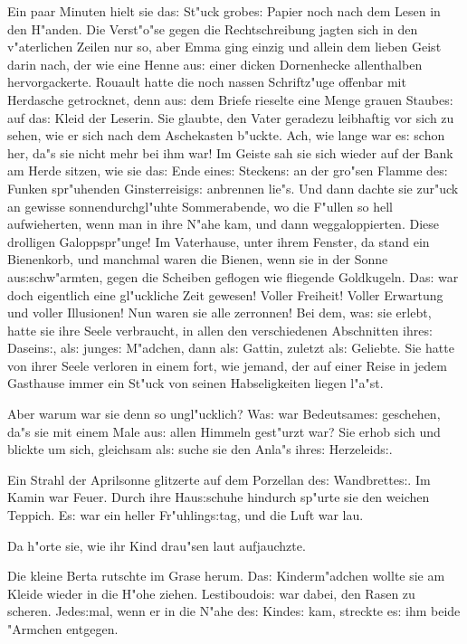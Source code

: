 \documentclass[oneside,12pt]{book}
\newcommand{\s}{s:}%
\begin{document}
Ein paar Minuten hielt sie da{\s} St"uck grobe{\s} Papier noch
nach dem Lesen in den H"anden. Die Verst"o"se gegen die
Rechtschreibung jagten sich in den v"aterlichen Zeilen nur so,
aber Emma ging einzig und allein dem lieben Geist darin nach, der
wie eine Henne au{\s} einer dicken Dornenhecke allenthalben
hervorgackerte. Rouault hatte die noch nassen Schrift\/z"uge
offenbar mit Herdasche getrocknet, denn au{\s} dem Briefe rieselte
eine Menge grauen Staube{\s} auf da{\s} Kleid der Leserin. Sie
glaubte, den Vater geradezu leibhaftig vor sich zu sehen, wie er
sich nach dem Aschekasten b"uckte. Ach, wie lange war e{\s} schon
her, da"s sie nicht mehr bei ihm war! Im Geiste sah sie sich
wieder auf der Bank am Herde sitzen, wie sie da{\s} Ende eine{\s}
Stecken{\s} an der gro"sen Flamme de{\s} Funken spr"uhenden
Ginsterreisig{\s} anbrennen lie"s. Und dann dachte sie zur"uck an
gewisse sonnendurchgl"uhte Sommerabende, wo die F"ullen so hell
aufwieherten, wenn man in ihre N"ahe kam, und dann
weggaloppierten. Diese drolligen Galoppspr"unge! Im Vaterhause,
unter ihrem Fenster, da stand ein Bienenkorb, und manchmal waren
die Bienen, wenn sie in der Sonne au{\s}schw"armten, gegen die
Scheiben geflogen wie fliegende Goldkugeln. Da{\s} war doch
eigentlich eine gl"uckliche Zeit gewesen! Voller Freiheit! Voller
Erwartung und voller Illusionen! Nun waren sie alle zerronnen! Bei
dem, wa{\s} sie erlebt, hatte sie ihre Seele verbraucht, in allen
den verschiedenen Abschnitten ihre{\s} Dasein{\s}, al{\s}
junge{\s} M"adchen, dann al{\s} Gattin, zuletzt al{\s} Geliebte.
Sie hatte von ihrer Seele verloren in einem fort, wie jemand, der
auf einer Reise in jedem Gasthause immer ein St"uck von seinen
Habseligkeiten liegen l"a"st.

Aber warum war sie denn so ungl"ucklich? Wa{\s} war Bedeutsame{\s}
geschehen, da"s sie mit einem Male au{\s} allen Himmeln gest"urzt
war? Sie erhob sich und blickte um sich, gleichsam al{\s} suche
sie den Anla"s ihre{\s} Herzeleid{\s}.

Ein Strahl der Aprilsonne glitzerte auf dem Porzellan de{\s}
Wandbrette{\s}. Im Kamin war Feuer. Durch ihre Hau{\s}schuhe
hindurch sp"urte sie den weichen Teppich. E{\s} war ein heller
Fr"uhling{\s}tag, und die Luft war lau.

Da h"orte sie, wie ihr Kind drau"sen laut aufjauchzte.

Die kleine Berta rutschte im Grase herum. Da{\s} Kinderm"adchen
wollte sie am Kleide wieder in die H"ohe ziehen. Lestiboudoi{\s}
war dabei, den Rasen zu scheren. Jede{\s}mal, wenn er in die N"ahe
de{\s} Kinde{\s} kam, streckte e{\s} ihm beide "Armchen entgegen.
\end{document}
